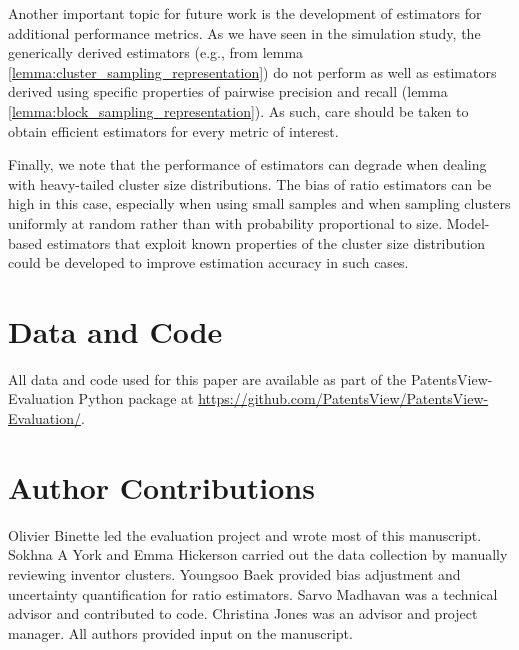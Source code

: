 \documentclass[fontsize=11pt]{article}
\newcommand{\ob}[1]{{#1}}
\theoremstyle{definition}
\begin{document}
{Another important topic for future work is the development of estimators for additional performance metrics. As we have seen in the simulation study, the generically derived estimators (e.g., from lemma \ref{lemma:cluster_sampling_representation}) do not perform as well as estimators derived using specific properties of pairwise precision and recall (lemma \ref{lemma:block_sampling_representation}). As such, care should be taken to obtain efficient estimators for every metric of interest.}

\ob{Finally, we note that the performance of estimators can degrade when dealing with heavy-tailed cluster size distributions. The bias of ratio estimators can be high in this case, especially when using small samples and when sampling clusters uniformly at random rather than with probability proportional to size. Model-based estimators that exploit known properties of the cluster size distribution could be developed to improve estimation accuracy in such cases.}


\section*{Data and Code}

All data and code used for this paper are available as part of the PatentsView-Evaluation Python package at \hyperref[https://github.com/PatentsView/PatentsView-Evaluation/]{https://github.com/PatentsView/PatentsView-Evaluation/}.


\section*{Author Contributions}

Olivier Binette led the evaluation project and wrote most of this manuscript. Sokhna A York and Emma Hickerson carried out the data collection by manually reviewing inventor clusters. Youngsoo Baek provided bias adjustment and uncertainty quantification for ratio estimators. Sarvo Madhavan was a technical advisor and contributed to code. Christina Jones was an advisor and project manager. All authors provided input on the manuscript.





\appendix
\end{document}
